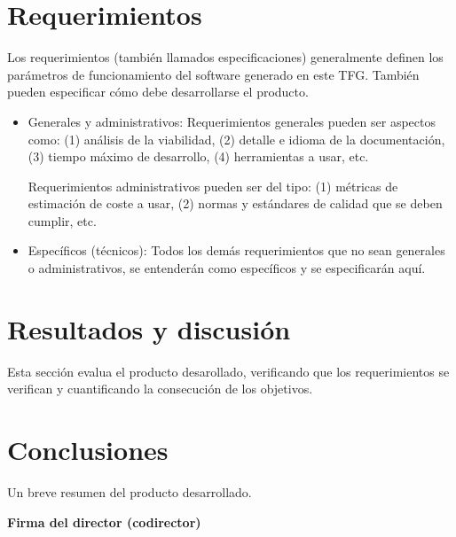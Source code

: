 \documentclass[titlepage, 12pt, a4paper, oneside]{article}
\begin{document}
\section{Requerimientos}
Los requerimientos (también llamados especificaciones) generalmente
definen los parámetros de funcionamiento del software generado en este
TFG. También pueden especificar cómo debe desarrollarse el producto.
\begin{itemize}
\item Generales y administrativos:
Requerimientos generales pueden ser aspectos como: (1) análisis de la
viabilidad, (2) detalle e idioma de la documentación, (3) tiempo
máximo de desarrollo, (4) herramientas a usar, etc.

Requerimientos administrativos pueden ser del tipo: (1) métricas de
estimación de coste a usar, (2) normas y estándares de calidad que se
deben cumplir, etc.

\item Específicos (técnicos):
Todos los demás requerimientos que no sean generales o
administrativos, se entenderán como específicos y se especificarán aquí.
\end{itemize}

\section{Resultados y discusión}
Esta sección evalua el producto desarollado, verificando que los
requerimientos se verifican y cuantificando la consecución de los
objetivos.

\section{Conclusiones}
Un breve resumen del producto desarrollado.




\begin{center}
  \textbf{Firma del director (codirector)}
\end{center}
\end{document}
